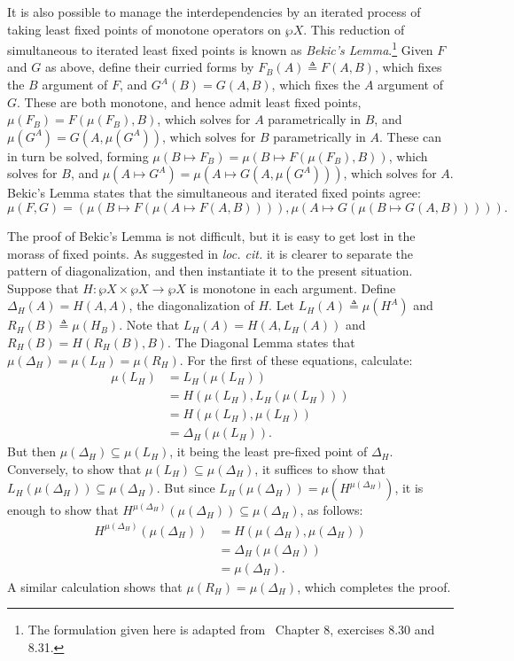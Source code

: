 \documentclass[11pt,twoside]{article}
\newcommand{\eqdef}{\mathrel{\triangleq}}
\begin{document}
It is also possible to manage the interdependencies by an iterated process of taking least
fixed points of monotone operators on $\wp{X}$.  This reduction of simultaneous to iterated
least fixed points is known as \emph{Bekic's Lemma}.\footnote{The formulation given here
  is adapted from~\citet{davey-priestley} Chapter 8, exercises 8.30 and 8.31.}  Given $F$
and $G$ as above, define their curried forms by $F_{B}(A)\eqdef{} F(A,B)$, which fixes the
$B$ argument of $F$, and $G^{A}(B)=G(A,B)$, which fixes the $A$ argument of $G$.  These
are both monotone, and hence admit least fixed points, $\mu(F_{B})=F(\mu(F_{B}),B)$, which
solves for $A$ parametrically in $B$, and $\mu(G^{A})=G(A,\mu(G^{A}))$, which solves for
$B$ parametrically in $A$.  These can in turn be solved, forming
$\mu(B\mapsto F_{B})=\mu(B\mapsto F(\mu(F_{B}),B))$, which solves for $B$, and
$\mu(A\mapsto G^{A})=\mu(A\mapsto G(A,\mu(G^{A})))$, which solves for $A$.  Bekic's Lemma states that the
simultaneous and iterated fixed points agree:
$$\mu(F,G) = (\mu(B\mapsto F(\mu(A\mapsto F(A,B)))),\mu(A\mapsto G(\mu(B\mapsto G(A,B))))).$$

The proof of Bekic's Lemma is not difficult, but it is easy to get lost in the morass of
fixed points.  As suggested in \textit{loc. cit.} it is clearer to separate the pattern of
diagonalization, and then instantiate it to the present situation.  Suppose that
$H:\wp{X}\times\wp{X}\to\wp{X}$ is monotone in each argument.  Define
$\Delta_{H}(A)=H(A,A)$, the diagonalization of $H$.  Let $L_{H}(A) \eqdef{} \mu(H^{A})$ and
$R_{H}(B) \eqdef{} \mu(H_{B})$.  Note that $L_{H}(A)=H(A,L_{H}(A))$ and
$R_{H}(B) = H(R_{H}(B),B)$.  The Diagonal Lemma states that
$\mu(\Delta_{H})=\mu(L_{H})=\mu(R_{H})$.  For the first of these equations, calculate:
\begin{align*}
  \mu(L_{H}) & = L_{H}(\mu(L_{H})) \\
           & = H(\mu(L_{H}),L_{H}(\mu(L_{H}))) \\
           & = H(\mu(L_{H}),\mu(L_{H})) \\
           & = \Delta_{H}(\mu(L_{H})).
\end{align*}
But then $\mu(\Delta_{H})\subseteq\mu(L_{H})$, it being the least pre-fixed point of
$\Delta_{H}$.  Conversely, to show that $\mu(L_{H})\subseteq\mu(\Delta_{H})$, it suffices to show that
$L_{H}(\mu(\Delta_{H}))\subseteq\mu(\Delta_{H})$.  But since $L_{H}(\mu(\Delta_{H}))=\mu(H^{\mu(\Delta_{H})})$, it is enough to
show that $H^{\mu(\Delta_{H})}(\mu(\Delta_{H}))\subseteq\mu(\Delta_{H})$, as follows:
\begin{align*}
  H^{\mu(\Delta_{H})}(\mu(\Delta_{H}))
  & = H(\mu(\Delta_{H}),\mu(\Delta_{H})) \\
  & = \Delta_{H}(\mu(\Delta_{H})) \\
  & = \mu(\Delta_{H}).
\end{align*}
A similar calculation shows that $\mu(R_{H})=\mu(\Delta_{H})$, which completes the proof.
\end{document}
